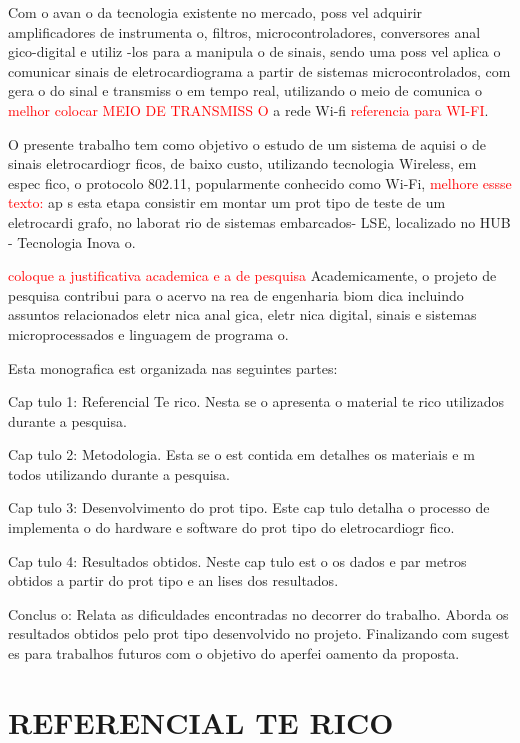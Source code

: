 \documentclass{article}
\begin{document}
Com o avan o da tecnologia existente no mercado,   poss vel adquirir amplificadores de instrumenta o, filtros, microcontroladores, conversores anal gico-digital e utiliz -los para a manipula o de sinais, sendo uma poss vel aplica o comunicar sinais de eletrocardiograma a partir de sistemas microcontrolados, com gera o do sinal e transmiss o em tempo real, utilizando o meio de comunica o \textcolor{red}{melhor colocar MEIO DE TRANSMISS O} a rede Wi-fi \textcolor{red}{referencia para WI-FI}.
  
	O presente trabalho tem como objetivo o estudo de um sistema de aquisi o de sinais eletrocardiogr ficos, de baixo custo, utilizando tecnologia Wireless, em espec fico, o protocolo 802.11, popularmente conhecido como Wi-Fi, \textcolor{red}{melhore essse texto:} ap s esta etapa consistir  em montar um prot tipo de teste de um eletrocardi grafo, no laborat rio de sistemas embarcados- LSE, localizado no HUB - Tecnologia Inova o.
    
    \textcolor{red}{coloque a justificativa academica e a de pesquisa} Academicamente, o projeto de pesquisa contribui para o acervo na  rea de engenharia biom dica incluindo assuntos relacionados   eletr nica anal gica, eletr nica digital, sinais e sistemas microprocessados e linguagem de programa o.
    
    Esta monografica est  organizada nas seguintes partes:
    
    Cap tulo 1: Referencial Te rico. Nesta se o apresenta o material te rico utilizados durante a pesquisa.
    
    Cap tulo 2: Metodologia. Esta se o est  contida em detalhes os materiais e m todos utilizando durante a pesquisa.
    
    Cap tulo 3: Desenvolvimento do prot tipo. Este cap tulo detalha o processo de implementa o do hardware e software do prot tipo do eletrocardiogr fico.
    
    Cap tulo 4: Resultados obtidos. Neste cap tulo est o os dados e par metros obtidos a partir do prot tipo e an lises dos resultados.
    
   Conclus o: Relata as dificuldades encontradas no decorrer do trabalho. Aborda os resultados obtidos pelo prot tipo desenvolvido no projeto. Finalizando com sugest es para trabalhos futuros com o objetivo do aperfei oamento da proposta.
   
    
    


\newpage
\section{REFERENCIAL TE RICO}	
\end{document}
